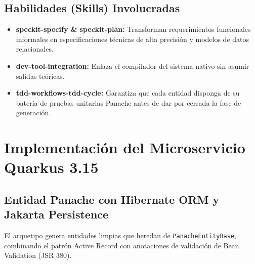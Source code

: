 \documentclass[11pt,a4paper]{report}
\begin{document}
\section{Habilidades (Skills) Involucradas}
\begin{itemize}
    \item \textbf{speckit-specify \& speckit-plan:} Transforman requerimientos funcionales informales en especificaciones técnicas de alta precisión y modelos de datos relacionales.
    \item \textbf{dev-tool-integration:} Enlaza el compilador del sistema nativo sin asumir salidas teóricas.
    \item \textbf{tdd-workflows-tdd-cycle:} Garantiza que cada entidad disponga de su batería de pruebas unitarias Panache antes de dar por cerrada la fase de generación.
\end{itemize}

\newpage

\chapter{Implementación del Microservicio Quarkus 3.15}

\section{Entidad Panache con Hibernate ORM y Jakarta Persistence}
El arquetipo genera entidades limpias que heredan de \texttt{PanacheEntityBase}, combinando el patrón Active Record con anotaciones de validación de Bean Validation (JSR 380).
\end{document}
